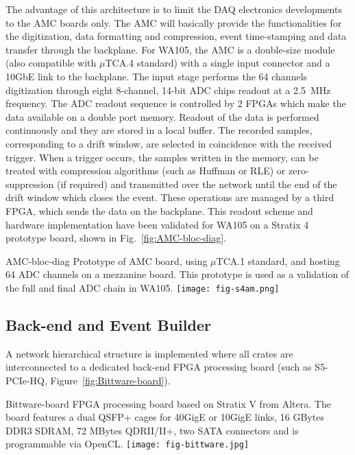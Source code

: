 The advantage of this architecture is to limit the DAQ electronics
developments to the AMC boards only. The AMC will basically provide
the functionalities for the digitization, data formatting and
compression, event time-stamping and data transfer through the
backplane. For WA105, the AMC is a double-size module (also compatible
with $\mu$TCA.4 standard) with a single input connector and a 10GbE
link to the backplane. The input stage performs the 64 channels
digitization through eight 8-channel, 14-bit ADC chips readout at a
2.5~MHz frequency. The ADC readout sequence is controlled by 2 FPGAs
which make the data available on a double port memory. Readout of the
data is performed continuously and they are stored in a local
buffer. The recorded samples, corresponding to a drift window, are
selected in coincidence with the received trigger. When a trigger
occurs, the samples written in the memory, can be treated with
compression algorithms (such as Huffman or RLE) or zero-suppression
(if required) and transmitted over the network until the end of the
drift window which closes the event. These operations are managed by a
third FPGA, which sends the data on the backplane.  This readout
scheme and hardware implementation have been validated for WA105 on a
Stratix 4 prototype board, shown in Fig.~\ref{fig:AMC-bloc-diag}.
\begin{cdrfigure}{AMC-bloc-diag}
{\small Prototype of AMC board, using $\mu$TCA.1 standard, and hosting 
64 ADC channels on a mezzanine board. This prototype is used as a validation 
of the full and final ADC chain in WA105.}
\texttt{[image: fig-s4am.png]}
\end{cdrfigure}

\subsection{Back-end and Event Builder}


A network hierarchical structure is implemented where all crates are
interconnected to a dedicated back-end FPGA processing board (such as
S5-PCIe-HQ, Figure~\ref{fig:Bittware-board}).
\begin{cdrfigure}{Bittware-board}
{\small FPGA processing board based on Stratix V from Altera. The board 
features a dual QSFP+ cages for 40GigE or 10GigE links, 16 GBytes DDR3 SDRAM, 
72 MBytes QDRII/II+, two SATA connectors and is programmable via OpenCL.}
\texttt{[image: fig-bittware.jpg]}
\end{cdrfigure}

